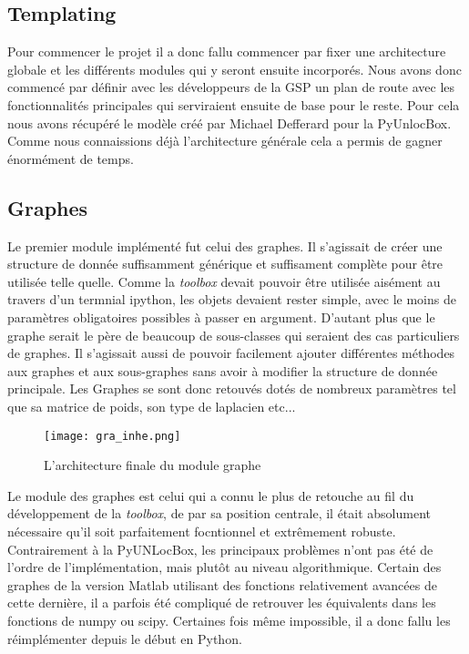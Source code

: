 \subsection*{Templating}

Pour commencer le projet il a donc fallu commencer par fixer une architecture globale et les différents modules qui y seront ensuite incorporés. Nous avons donc commencé par définir avec les développeurs de la GSP un plan de route avec les fonctionnalités principales qui serviraient ensuite de base pour le reste. Pour cela nous avons récupéré le modèle créé par Michael Defferard pour la PyUnlocBox. Comme nous connaissions déjà l'architecture générale cela a permis de gagner énormément de temps.

\subsection*{Graphes}

Le premier module implémenté fut celui des graphes. Il s'agissait de créer une structure de donnée suffisamment générique et suffisament complète pour être utilisée telle quelle. Comme la \emph{toolbox} devait pouvoir être utilisée aisément au travers d'un termnial ipython, les objets devaient rester simple, avec le moins de paramètres obligatoires possibles à passer en argument. D'autant plus que le graphe serait le père de beaucoup de sous-classes qui seraient des cas particuliers de graphes. Il s'agissait aussi de pouvoir facilement ajouter différentes méthodes aux graphes et aux sous-graphes sans avoir à modifier la structure de donnée principale.
Les Graphes se sont donc retouvés dotés de nombreux paramètres tel que sa matrice de poids, son type de laplacien etc...

\begin{figure}[h!]
    \center
    \texttt{[image: gra\_inhe.png]}
    \caption{L'architecture finale du module graphe}
\end{figure}

Le module des graphes est celui qui a connu le plus de retouche au fil du développement de la \emph{toolbox}, de par sa position centrale, il était absolument nécessaire qu'il soit parfaitement focntionnel et extrêmement robuste. Contrairement à la PyUNLocBox, les principaux problèmes n'ont pas été de l'ordre de l'implémentation, mais plutôt au niveau algorithmique. Certain des graphes de la version Matlab utilisant des fonctions relativement avancées de cette dernière, il a parfois été compliqué de retrouver les équivalents dans les fonctions de numpy ou scipy. Certaines fois même impossible, il a donc fallu les réimplémenter depuis le début en Python.


